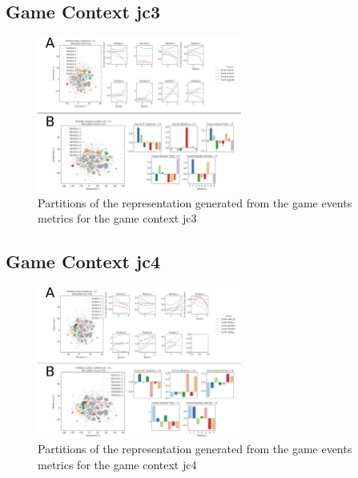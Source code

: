 \subsection{Game Context jc3}
\label{even_clust_jc3}

\begin{figure}[!htb]
\includegraphics[width=0.6\textwidth]{images/appendix_D/clust_even_jc3.png}
\centering
\caption[\textbf{Partitions of the representation generated from the game events metrics for the game context jc3}]{Partitions of the representation generated from the game events metrics for the game context jc3}
\end{figure}
\FloatBarrier

\subsection{Game Context jc4}
\label{even_clust_jc4}

\begin{figure}[!htb]
\includegraphics[width=0.6\textwidth]{images/appendix_D/clust_even_jc4.png}
\centering
\caption[\textbf{Partitions of the representation generated from the game events metrics for the game context jc4}]{Partitions of the representation generated from the game events metrics for the game context jc4}
\end{figure}
\FloatBarrier

